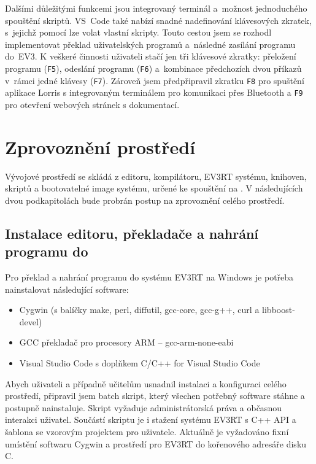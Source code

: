 Dalšími důležitými funkcemi jsou integrovaný terminál a~možnost jednoduchého spouštění skriptů.
VS~Code také nabízí snadné nadefinování klávesových zkratek, s~jejichž pomocí lze volat vlastní skripty.
Touto cestou jsem se rozhodl implementovat překlad uživatelských programů a~následné zasílání programu do~EV3.
K veškeré činnosti uživateli stačí jen tři klávesové zkratky: přeložení programu (\texttt{F5}), odeslání programu (\texttt{F6}) a~kombinace předchozích dvou příkazů v~rámci jedné klávesy (\texttt{F7}).
Zároveň jsem předpřipravil zkratku \texttt{F8} pro spuštění aplikace Lorris s integrovaným terminálem pro komunikaci přes Bluetooth a \texttt{F9} pro otevření webových stránek s dokumentací.


\section{Zprovoznění prostředí}

Vývojové prostředí se skládá z editoru, kompilátoru, EV3RT systému, knihoven, skriptů a bootovatelné image systému, určené ke spouštění na .
V následujících dvou podkapitolách bude probrán postup na zprovoznění celého prostředí.

\subsection{Instalace editoru, překladače a nahrání programu do }

Pro překlad a nahrání programu do systému EV3RT na Windows je potřeba nainstalovat následující software:

\begin{itemize}
    \item Cygwin (s balíčky make, perl, diffutil, gcc-core, gcc-g++, curl a libboost-devel)
    \item GCC překladač pro procesory ARM -- gcc-arm-none-eabi
    \item Visual Studio Code s doplňkem C/C++ for Visual Studio Code
\end{itemize}

Abych uživateli a případně učitelům usnadnil instalaci a konfiguraci celého prostředí, připravil jsem batch skript, který všechen potřebný software stáhne a postupně nainstaluje.
Skript vyžaduje administrátorská práva a občasnou interakci uživatel.
Součástí skriptu je i stažení systému EV3RT s C++ API a šablona se vzorovým projektem pro uživatele. 
Aktuálně je vyžadováno fixní umístění softwaru Cygwin a prostředí pro EV3RT do kořenového adresáře disku C.

